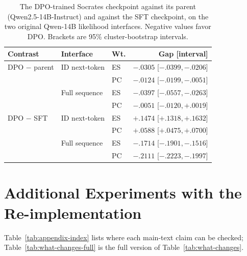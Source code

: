 \documentclass[11pt]{article}
\begin{document}
\begin{table}[!htb]
\centering\scriptsize
\setlength{\tabcolsep}{3pt}
\begin{tabular}{@{}lllr@{}}
\toprule
Contrast & Interface & Wt. & Gap [interval] \\
\midrule
DPO $-$ parent & ID next-token & ES & $-.0305$ [$-.0399,-.0206$] \\
 & & PC & $-.0124$ [$-.0199,-.0051$] \\
 & Full sequence & ES & $-.0397$ [$-.0557,-.0263$] \\
 & & PC & $-.0051$ [$-.0120,+.0019$] \\
\addlinespace[2pt]
DPO $-$ SFT & ID next-token & ES & $+.1474$ [$+.1318,+.1632$] \\
 & & PC & $+.0588$ [$+.0475,+.0700$] \\
 & Full sequence & ES & $-.1714$ [$-.1901,-.1516$] \\
 & & PC & $-.2111$ [$-.2223,-.1997$] \\
\bottomrule
\end{tabular}
\caption{The DPO-trained Socrates checkpoint against its parent
(Qwen2.5-14B-Instruct) and against the SFT checkpoint, on the two original
Qwen-14B likelihood interfaces. Negative values favor DPO. Brackets are 95\%
cluster-bootstrap intervals.}
\label{tab:dpo-control}
\end{table}
\FloatBarrier

\section{Additional Experiments with the Re-implementation}
\label{app:reimpl}

Table~\ref{tab:appendix-index} lists where each main-text claim can be checked; Table~\ref{tab:what-changes-full} is the full version of Table~\ref{tab:what-changes}.


\FloatBarrier
\end{document}
